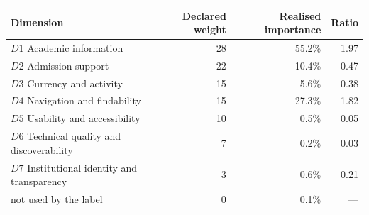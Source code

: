 \begin{tabular}{lrrr}
\toprule
\textbf{Dimension} & \textbf{Declared weight} & \textbf{Realised importance} & \textbf{Ratio} \\
\midrule
$D1$ Academic information & 28 & 55.2\% & 1.97 \\
$D2$ Admission support & 22 & 10.4\% & 0.47 \\
$D3$ Currency and activity & 15 & 5.6\% & 0.38 \\
$D4$ Navigation and findability & 15 & 27.3\% & 1.82 \\
$D5$ Usability and accessibility & 10 & 0.5\% & 0.05 \\
$D6$ Technical quality and discoverability & 7 & 0.2\% & 0.03 \\
$D7$ Institutional identity and transparency & 3 & 0.6\% & 0.21 \\
\midrule
not used by the label & 0 & 0.1\% & --- \\
\bottomrule
\end{tabular}
